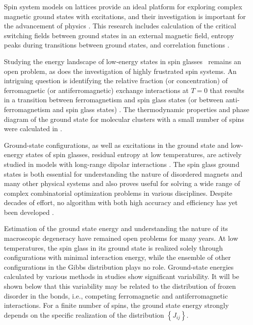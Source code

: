 \documentclass[preprint,12pt]{elsarticle}
\begin{document}
	Spin system models on lattices provide an ideal platform for exploring complex magnetic ground states with excitations, and their investigation is important for the advancement of physics \cite{lacroix2011introduction}. This research includes calculation of the critical switching fields between ground states in an external magnetic field, entropy peaks during transitions between ground states, and correlation functions \cite{ramirez2004effect, rosas2004random, andriushchenko2019large}.  
	
	Studying the energy landscape of low-energy states in spin glasses~\cite{biswas2023energy} remains an open problem, as does the investigation of highly frustrated spin systems. An intriguing question is identifying the relative fraction (or concentration) of ferromagnetic (or antiferromagnetic) exchange interactions at $T=0$ that results in a transition between ferromagnetism and spin glass states (or between anti-ferromagnetism and spin glass states) \cite{gruzberg2001random, honecker2001universality, picco2006strong, tsomokos2011interplay, zimmer2022role}. The thermodynamic properties and phase diagram of the ground state for molecular clusters with a small number of spins were calculated in \cite{dias2023ground}.
	
	Ground-state configurations, as well as excitations in the ground state and low-energy states of spin glasses, residual entropy at low temperatures, are actively studied in models with long-range dipolar interactions \cite{makarova2021low, singh2024micromagnetic}. The spin glass ground states is both essential for understanding the nature of disordered magnets and many other physical systems and also proves useful for solving a wide range of complex combinatorial optimization problems in various disciplines. Despite decades of effort, no algorithm with both high accuracy and efficiency has yet been developed \cite{fan2023searching}.  
	
	Estimation of the ground state energy and understanding the nature of its macroscopic degeneracy have remained open problems for many years. At low temperatures, the spin glass in its ground state is realized solely through configurations with minimal interaction energy, while the ensemble of other configurations in the Gibbs distribution plays no role. Ground-state energies calculated by various methods in studies \cite{thouless1977solution, sherrington1975solvable, tanaka1980analytic, klein1976comparison, kirkpatrick1978infinite, karandashev2019global, palmer1999ground, campbell2004energy, roma2009ground} show significant variability. It will be shown below that this variability may be related to the distribution of frozen disorder in the bonds, i.e., competing ferromagnetic and antiferromagnetic interactions. For a finite number of spins, the ground state energy strongly depends on the specific realization of the distribution $\left\lbrace J_{ij} \right\rbrace$.  
	
\end{document}
